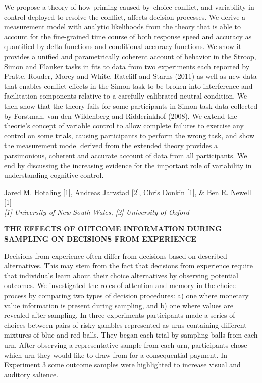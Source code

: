 \documentclass[]{article}
\begin{document}
We propose a theory of how priming caused by~choice conflict, and
variability in control deployed to resolve the conflict, affects
decision processes. We derive a measurement model with analytic
likelihoods from the theory that is able to account for the fine-grained
time course of both response speed and accuracy as quantified by delta
functions and conditional-accuracy functions. We show it provides a
unified and parametrically coherent account of behavior in the Stroop,
Simon and Flanker tasks in fits to data from two experiments each
reported by Pratte, Rouder, Morey and White, Ratcliff and Starns (2011)
as well as new data that enables conflict effects in the Simon task to
be broken into interference and facilitation components relative to a
carefully calibrated neutral condition. We then show that the theory
fails for some participants in Simon-task data collected by Forstman,
van den Wildenberg and Ridderinkhof (2008). We extend the theorie's
concept of variable control to allow complete failures to exercise any
control on some trials, causing participants to perform the wrong task,
and show the measurement model derived from the extended theory provides
a parsimonious, coherent and accurate account of data from all
participants. We end by discussing the increasing evidence for the
important role of variability in understanding cognitive control.\\
\pagebreak  

Jared M. Hotaling {[}1{]}, Andreas Jarvstad {[}2{]}, Chris Donkin
{[}1{]}, \& Ben R. Newell {[}1{]}\\
\emph{{[}1{]} University of New South Wales, {[}2{]} University of
Oxford}

\textbf{THE EFFECTS OF OUTCOME INFORMATION DURING SAMPLING ON DECISIONS
FROM EXPERIENCE}

Decisions from experience often differ from decisions based on described
alternatives. This may stem from the fact that decisions from experience
require that individuals learn about their choice alternatives by
observing potential outcomes. We investigated the roles of attention and
memory in the choice process by comparing two types of decision
procedures: a) one where monetary value information is present during
sampling, and b) one where values are revealed after sampling. In three
experiments participants made a series of choices between pairs of risky
gambles represented as urns containing different mixtures of blue and
red balls. They began each trial by sampling balls from each urn. After
observing a representative sample from each urn, participants chose
which urn they would like to draw from for a consequential payment. In
Experiment 3 some outcome samples were highlighted to increase visual
and auditory salience.
\end{document}
